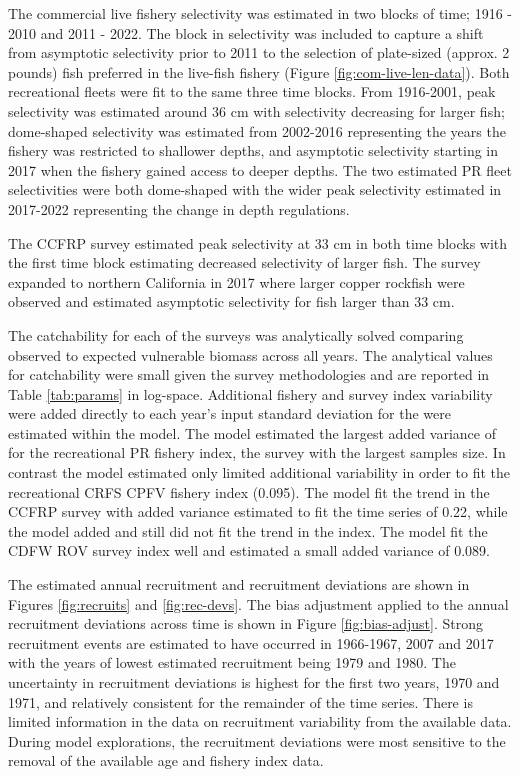 \documentclass[11pt,
  english,
  letterpaper,
]{article}
\begin{document}
The commercial live fishery selectivity was estimated in two blocks of time; 1916 - 2010 and 2011 - 2022. The block in selectivity was included to capture a shift from asymptotic selectivity prior to 2011 to the selection of plate-sized (approx. 2 pounds) fish preferred in the live-fish fishery (Figure \ref{fig:com-live-len-data}). Both recreational fleets were fit to the same three time blocks. From 1916-2001, peak selectivity was estimated around 36 cm with selectivity decreasing for larger fish; dome-shaped selectivity was estimated from 2002-2016 representing the years the fishery was restricted to shallower depths, and asymptotic selectivity starting in 2017 when the fishery gained access to deeper depths. The two estimated PR fleet selectivities were both dome-shaped with the wider peak selectivity estimated in 2017-2022 representing the change in depth regulations.

The CCFRP survey estimated peak selectivity at 33 cm in both time blocks with the first time block estimating decreased selectivity of larger fish. The survey expanded to northern California in 2017 where larger copper rockfish were observed and estimated asymptotic selectivity for fish larger than 33 cm.

The catchability for each of the surveys was analytically solved comparing observed to expected vulnerable biomass across all years. The analytical values for catchability were small given the survey methodologies and are reported in Table \ref{tab:params} in log-space. Additional fishery and survey index variability were added directly to each year's input standard deviation for the were estimated within the model. The model estimated the largest added variance of for the recreational PR fishery index, the survey with the largest samples size. In contrast the model estimated only limited additional variability in order to fit the recreational CRFS CPFV fishery index (0.095). The model fit the trend in the CCFRP survey with added variance estimated to fit the time series of 0.22, while the model added and still did not fit the trend in the index. The model fit the CDFW ROV survey index well and estimated a small added variance of 0.089.

The estimated annual recruitment and recruitment deviations are shown in Figures \ref{fig:recruits} and \ref{fig:rec-devs}. The bias adjustment applied to the annual recruitment deviations across time is shown in Figure \ref{fig:bias-adjust}. Strong recruitment events are estimated to have occurred in 1966-1967, 2007 and 2017 with the years of lowest estimated recruitment being 1979 and 1980. The uncertainty in recruitment deviations is highest for the first two years, 1970 and 1971, and relatively consistent for the remainder of the time series. There is limited information in the data on recruitment variability from the available data. During model explorations, the recruitment deviations were most sensitive to the removal of the available age and fishery index data.
\end{document}
